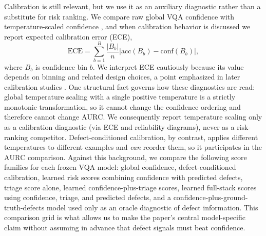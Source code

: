 \documentclass{ieeeaccess}
\newcommand{\aurc}{\mathrm{AURC}}
\begin{document}
Calibration is still relevant, but we use it as an auxiliary diagnostic rather than a substitute for risk ranking. We compare raw global VQA confidence with temperature-scaled confidence \cite{guo2017calibration}, and when calibration behavior is discussed we report expected calibration error (ECE),
\begin{equation}
\mathrm{ECE} = \sum_{b=1}^{B}\frac{|B_b|}{n}\left|\mathrm{acc}(B_b)-\mathrm{conf}(B_b)\right|,
\end{equation}
where $B_b$ is confidence bin $b$. We interpret ECE cautiously because its value depends on binning and related design choices, a point emphasized in later calibration studies \cite{nixon2019measuringcalibration,minderer2021revisiting}. One structural fact governs how these diagnostics are read: global temperature scaling with a single positive temperature is a strictly monotonic transformation, so it cannot change the confidence ordering and therefore cannot change $\aurc$. We consequently report temperature scaling only as a calibration diagnostic (via ECE and reliability diagrams), never as a risk-ranking competitor. Defect-conditioned calibration, by contrast, applies different temperatures to different examples and \emph{can} reorder them, so it participates in the $\aurc$ comparison. Against this background, we compare the following score families for each frozen VQA model: global confidence, defect-conditioned calibration, learned risk scores combining confidence with predicted defects, triage score alone, learned confidence-plus-triage scores, learned full-stack scores using confidence, triage, and predicted defects, and a confidence-plus-ground-truth-defects model used only as an oracle diagnostic of defect information. This comparison grid is what allows us to make the paper's central model-specific claim without assuming in advance that defect signals must beat confidence.
\end{document}
